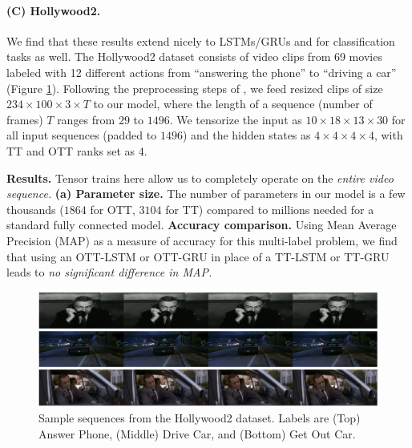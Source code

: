 \paragraph{(C) Hollywood2.}
We find
    that these results extend nicely to LSTMs/GRUs and for classification tasks
    as well. The Hollywood2 dataset \citep{marszalek09} consists of video clips from 69 movies
    labeled with 12 different actions from ``answering the phone'' to ``driving a car'' (Figure \ref{fig:hollywood}).
    Following the preprocessing steps of \cite{pmlr-v70-yang17e}, we feed resized
    clips of size $234 \times 100 \times 3 \times T$ to our model, where the length of a sequence
    (number of frames) $T$ ranges from $29$ to $1496$. We tensorize the
    input as $10 \times 18 \times 13 \times 30$ for all input sequences (padded to $1496$) and the
    hidden states as $4 \times 4 \times 4 \times 4$, with TT and OTT ranks set as 4.

\textbf{Results.} Tensor trains here allow us to completely operate on the \textit{entire video sequence.}
    \textbf{(a) Parameter size.}
    The number of parameters in our model is a few thousands ($1864$ for OTT, $3104$ for TT)
    compared to millions needed for a standard fully connected model.
\textbf{ Accuracy comparison.}
    Using Mean Average Precision (MAP) as a measure of accuracy for this multi-label problem, we
    find that using an OTT-LSTM or OTT-GRU in place of a TT-LSTM or TT-GRU leads to
    \textit{no significant difference in MAP.} 
\begin{figure}
	\centering
	\includegraphics[width=\columnwidth]{4_ott/figs/Hollywood2_samples.png}
	\caption{\label{fig:hollywood} Sample sequences from the Hollywood2 dataset. Labels are (Top) Answer Phone, (Middle) Drive Car, and (Bottom) Get Out Car.}
\end{figure}

